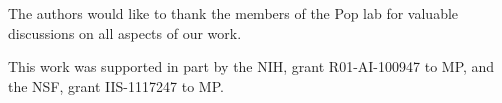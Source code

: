 \documentclass[conference]{IEEEtran}
\begin{document}
The authors would like to thank the members of the Pop lab for valuable discussions on all aspects of our work.

This work was supported in part by the NIH, grant R01-AI-100947 to MP,
and the NSF, grant IIS-1117247 to MP.





%
%
%





\end{document}
